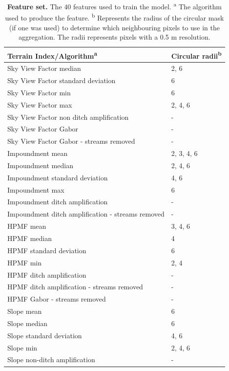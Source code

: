 \documentclass[11pt, review]{elsarticle} %
\begin{document}
\begin{table} [!htb]
\centering
    {\begin{tabular}{ll}
      \textbf{Terrain Index/Algorithm}\textsuperscript{a} & \textbf{Circular radii}\textsuperscript{b} \\ 
      \hline
      Sky View Factor median &2, 6 \\
      Sky View Factor standard deviation & 6 \\
      Sky View Factor min & 6 \\
      Sky View Factor max & 2, 4, 6 \\
      Sky View Factor non ditch amplification & - \\ 
      Sky View Factor Gabor & - \\
      Sky View Factor Gabor - streams removed & -\\
      
      Impoundment mean & 2, 3, 4, 6 \\
      Impoundment median & 2, 4, 6 \\
      Impoundment standard deviation & 4, 6 \\
      Impoundment max & 6 \\
      Impoundment ditch amplification & - \\
      Impoundment ditch amplification - streams removed & - \\
      
      HPMF mean & 3, 4, 6 \\
      HPMF median & 4 \\
      HPMF standard deviation & 6 \\
      HPMF min & 2, 4 \\
      HPMF ditch amplification & - \\
      HPMF ditch amplification - streams removed & - \\
      HPMF Gabor - streams removed & -\\
      
      Slope mean & 6 \\
      Slope median & 6 \\
      Slope standard deviation & 4, 6 \\
      Slope min & 2, 4, 6 \\
      Slope non-ditch amplification & - \\
      \hline
    \end{tabular}}
    \caption{\textbf{Feature set.} The 40 features used to train the model.
    \newline \textsuperscript{a} The algorithm used to produce the feature. \newline
        \textsuperscript{b} Represents the radius of the circular mask (if one was used) to determine which neighbouring pixels to use in the aggregation. The radii represents pixels with a 0.5 m resolution.}
    \label{featuretable}
\end{table}
\end{document}
